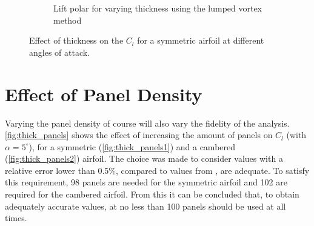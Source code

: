\begin{figure}[h]
\begin{subfigure}{.5\textwidth}
    \caption{\centering Lift polar for varying thickness using the lumped vortex method}
    \label{fig:thin_tc_cla}
  \end{subfigure}
  \caption{\centering Effect of thickness on the $C_l$ for a symmetric airfoil at different angles of attack.}
  \label{fig:tc_cla}
\end{figure}


\section{Effect of Panel Density}
\label{sec:panels}
Varying the panel density of course will also vary the fidelity of the analysis.
\autoref{fig:thick_panels} shows the effect of increasing the amount of panels
on $C_l$ (with $\alpha = 5^{\circ}$), for a symmetric (\autoref{fig:thick_panels1}) and a cambered
(\autoref{fig:thick_panels2}) airfoil. The choice was made to consider values
with a relative error lower than 0.5\%, compared to values from \xfoil, are
adequate. To satisfy this requirement, 98 panels are needed for the symmetric
airfoil and 102 are required for the cambered airfoil. From this it can be
concluded that, to obtain adequately accurate values, at no less than 100 panels
should be used at all times.

